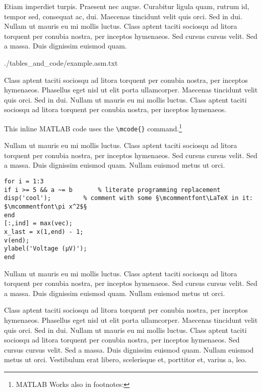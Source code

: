Etiam imperdiet turpis. Praesent nec augue. Curabitur ligula quam, rutrum id, tempor sed, consequat ac, dui. Maecenas tincidunt velit quis orci. Sed in dui. Nullam ut mauris eu mi mollis luctus. Class aptent taciti sociosqu ad litora torquent per conubia nostra, per inceptos hymenaeos. Sed cursus cursus velit. Sed a massa. Duis dignissim euismod quam.

\begin{spacing}{0.5}
	
	{./tables_and_code/example.asm.txt}
\end{spacing}


Class aptent taciti sociosqu ad litora torquent per conubia nostra, per inceptos hymenaeos. Phasellus eget nisl ut elit porta ullamcorper. Maecenas tincidunt velit quis orci. Sed in dui. Nullam ut mauris eu mi mollis luctus. Class aptent taciti sociosqu ad litora torquent per conubia nostra, per inceptos hymenaeos.

This inline MATLAB code  uses the \verb|\mcode{}| command.\footnote{MATLAB Works also in footnotes: }

Nullam ut mauris eu mi mollis luctus. Class aptent taciti sociosqu ad litora torquent per conubia nostra, per inceptos hymenaeos. Sed cursus cursus velit. Sed a massa. Duis dignissim euismod quam. Nullam euismod metus ut orci.

\begin{lstlisting}[language=matlabfloz,caption={\mcode{Matlab Function}}]
for i = 1:3
if i >= 5 && a ~= b       % literate programming replacement
disp('cool');         % comment with some §\mcommentfont\LaTeX in it: $\mcommentfont\pi x^2$§
end
[:,ind] = max(vec);
x_last = x(1,end) - 1;
v(end);
ylabel('Voltage (µV)');
end
\end{lstlisting}

Nullam ut mauris eu mi mollis luctus. Class aptent taciti sociosqu ad litora torquent per conubia nostra, per inceptos hymenaeos. Sed cursus cursus velit. Sed a massa. Duis dignissim euismod quam. Nullam euismod metus ut orci.



Class aptent taciti sociosqu ad litora torquent per conubia nostra, per inceptos hymenaeos. Phasellus eget nisl ut elit porta ullamcorper. Maecenas tincidunt velit quis orci. Sed in dui. Nullam ut mauris eu mi mollis luctus. Class aptent taciti sociosqu ad litora torquent per conubia nostra, per inceptos hymenaeos. Sed cursus cursus velit. Sed a massa. Duis dignissim euismod quam. Nullam euismod metus ut orci. Vestibulum erat libero, scelerisque et, porttitor et, varius a, leo.


